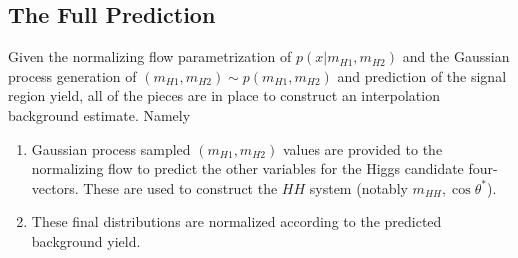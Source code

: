 \subsection{The Full Prediction}
Given the normalizing flow parametrization of $p(x | m_{H1}, m_{H2})$ and the Gaussian process generation of 
$(m_{H1}, m_{H2}) \sim p(m_{H1}, m_{H2})$ and prediction of the signal region yield, all of the pieces are 
in place to construct an interpolation background estimate. Namely
\begin{enumerate}
	\item Gaussian process sampled $(m_{H1}, m_{H2})$ values are provided to the normalizing flow to predict 
	the other variables for the Higgs candidate four-vectors. These are used to construct the $HH$ system (notably 
	$m_{HH}, \cos{\theta^{*}}$).
	\item These final distributions are normalized according to the predicted background yield.
\end{enumerate}

